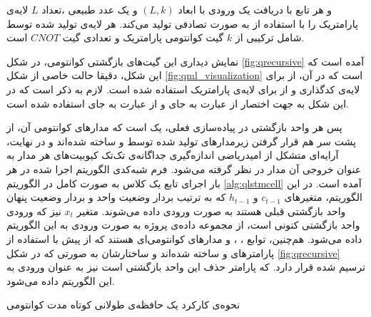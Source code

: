 و هر تابع 
با دریافت یک ورودی با ابعاد
$(L, k)$
و یک عدد طبیعی
،تعداد
$L$
لایه‌ی پارامتریک را با استفاده از
به صورت تصادفی تولید می‌کند.
هر لایه‌ی تولید شده توسط
شامل ترکیبی از 
$k$
گیت کوانتومی پارامتریک و تعدادی گیت 
$CNOT$
است.


نمایش دیداری این گیت‌های بازگشتی کوانتومی، در شکل
\ref{fig:qrecursive}
آمده است که این شکل، دقیقا حالت خاصی از شکل
\ref{fig:qml_visualization}
است که در آن، از 
برای لایه‌ی کدگذاری و از
برای لایه‌ی پارامتریک استفاده شده است.
لازم به ذکر است که در این شکل به جهت اختصار از عبارت
به جای
و از عبارت
به جای 
استفاده شده است.

پس هر واحد بازگشتی در پیاده‌سازی فعلی، یک
است که مدارهای کوانتومی آن، از پشت سر هم قرار گرفتن زیرمدارهای تولید شده توسط
و
ساخته شده‌اند و در نهایت، آرایه‌ای متشکل از امیدریاضی اندازه‌گیری جداگانه‌ی تک‌تک کیوبیت‌های هر مدار به عنوان خروجی آن مدار در نظر گرفته می‌شود.
فرم شبه‌کدی الگوریتم اجرا شده در هر بار اجرای تابع
یک کلاس
به صورت کامل در الگوریتم
\ref{alg:qlstmcell}
آمده است. در این الگوریتم، متغیرهای
$c_{t-1}$ و
$h_{t-1}$
که به ترتیب بردار وضعیت واحد و بردار وضعیت پنهان واحد بازگشتی قبلی هستند به صورت ورودی داده می‌شوند. متغیر
$x_{t}$
نیز که ورودی واحد بازگشتی کنونی است، از مجموعه داده‌ی پروژه به صورت ورودی به این الگوریتم داده می‌شود. هم‌چنین، توابع
،
،
 و
مدارهای کوانتومی‌ای هستند که از پیش با استفاده از پارامترهای
و
ساخته شده‌اند و ساختارشان به صورتی که در شکل
\ref{fig:qrecursive}
ترسیم شده قرار دارد.
که پارامتر حذف این واحد بازگشتی است نیز به عنوان ورودی به این الگوریتم داده می‌شود.

\begin{algorithm}[t]
\caption{نحوه‌ی کارکرد یک حافظه‌ی طولانی کوتاه مدت کوانتومی} \label{alg:full_qlstm}
\end{algorithm}

